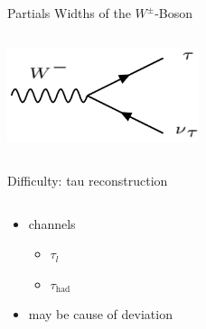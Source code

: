 \begin{frame}{Partials Widths of the $W^{\pm}$-Boson}
\begin{columns}
\begin{column}{0.5\textwidth}
                \includegraphics[width = 0.42\textwidth]{content/images/Wdecay_tau.png}
            \end{column}
        \end{columns}
    \end{frame}

    \begin{frame}{Difficulty: tau reconstruction}
        \begin{columns}
            \begin{column}{0.45\textwidth}
                \begin{itemize}
                    \item channels
                    \begin{itemize}
                        \item $ \tau_l$
                        \item $ \tau_{\text{had}}$
                    \end{itemize}
                    \item <4> may be cause of deviation
                \end{itemize}
            \end{column}

\end{columns}
\end{frame}
